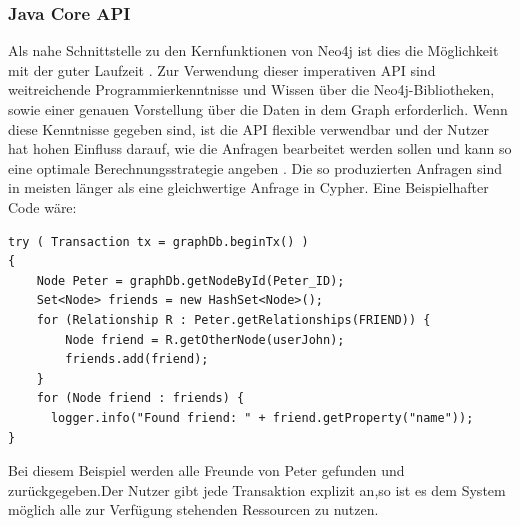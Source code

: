 \subsubsection{Java Core API}
Als nahe Schnittstelle zu den Kernfunktionen von Neo4j ist dies die Möglichkeit mit der guter Laufzeit \parencite{vukotic2015neo4j}. Zur Verwendung dieser imperativen API sind weitreichende Programmierkenntnisse und Wissen über die Neo4j-Bibliotheken, sowie einer genauen Vorstellung über die Daten in dem Graph erforderlich. Wenn diese Kenntnisse gegeben sind, ist die API flexible verwendbar  und der Nutzer hat hohen Einfluss darauf, wie die Anfragen bearbeitet werden sollen und kann so eine optimale Berechnungsstrategie angeben \parencite{vukotic2015neo4j}. Die so produzierten Anfragen sind in meisten länger als eine gleichwertige Anfrage in Cypher. Eine Beispielhafter Code wäre: \newline
\begin{Verbatim}[frame=single]
try ( Transaction tx = graphDb.beginTx() )
{
	Node Peter = graphDb.getNodeById(Peter_ID);
	Set<Node> friends = new HashSet<Node>();
	for (Relationship R : Peter.getRelationships(FRIEND)) {  
		Node friend = R.getOtherNode(userJohn);
		friends.add(friend);                        
	}
	for (Node friend : friends) {
	  logger.info("Found friend: " + friend.getProperty("name")); 
}

\end{Verbatim}
Bei diesem Beispiel werden alle Freunde von Peter gefunden und zurückgegeben.Der Nutzer gibt jede Transaktion explizit an,so ist es dem System möglich alle zur Verfügung stehenden Ressourcen zu nutzen.

